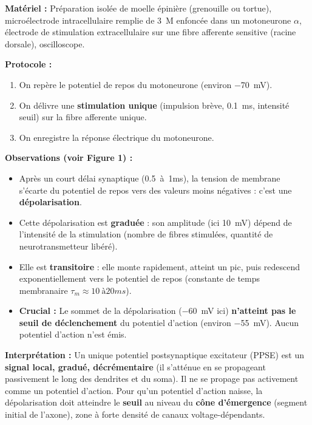 \documentclass[11pt]{article}
\begin{document}
\begin{experience}
\textbf{Matériel :} Préparation isolée de moelle épinière (grenouille ou tortue), microélectrode intracellulaire remplie de  \SI{3}{M} enfoncée dans un motoneurone $\alpha$, électrode de stimulation extracellulaire sur une fibre afferente sensitive (racine dorsale), oscilloscope.

\textbf{Protocole :}
\begin{enumerate}
    \item On repère le potentiel de repos du motoneurone (environ \SI{-70}{mV}).
    \item On délivre une \textbf{stimulation unique} (impulsion brève, \SI{0,1}{ms}, intensité seuil) sur la fibre afferente unique.
    \item On enregistre la réponse électrique du motoneurone.
\end{enumerate}

\textbf{Observations (voir Figure 1) :}
\begin{itemize}
    \item Après un court délai synaptique (\SI{0,5}{à 1}{ms}), la tension de membrane s'écarte du potentiel de repos vers des valeurs moins négatives : c'est une \textbf{dépolarisation}.
    \item Cette dépolarisation est \textbf{graduée} : son amplitude (ici \SI{+10}{mV}) dépend de l'intensité de la stimulation (nombre de fibres stimulées, quantité de neurotransmetteur libéré).
    \item Elle est \textbf{transitoire} : elle monte rapidement, atteint un pic, puis redescend exponentiellement vers le potentiel de repos (constante de temps membranaire $\tau_m \approx \SI{10}{à 20}{ms}$).
    \item \textbf{Crucial :} Le sommet de la dépolarisation (\SI{-60}{mV} ici) \textbf{n'atteint pas le seuil de déclenchement} du potentiel d'action (environ \SI{-55}{mV}). Aucun potentiel d'action n'est émis.
\end{itemize}

\textbf{Interprétation :}
Un unique potentiel postsynaptique excitateur (PPSE) est un \textbf{signal local, gradué, décrémentaire} (il s'atténue en se propageant passivement le long des dendrites et du soma). Il ne se propage pas activement comme un potentiel d'action. Pour qu'un potentiel d'action naisse, la dépolarisation doit atteindre le \textbf{seuil} au niveau du \textbf{cône d'émergence} (segment initial de l'axone), zone à forte densité de canaux  voltage-dépendants.


\end{experience}
\end{document}
